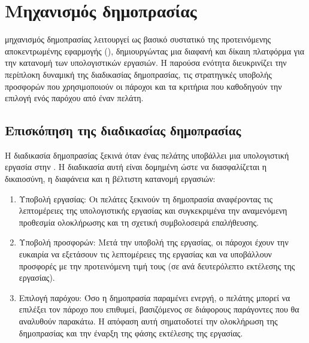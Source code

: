 \chapter{Μηχανισμός δημοπρασίας}
 μηχανισμός δημοπρασίας λειτουργεί ως βασικό συστατικό της προτεινόμενης αποκεντρωμένης εφαρμογής (), δημιουργώντας μια διαφανή και δίκαιη πλατφόρμα για την κατανομή των υπολογιστικών εργασιών. Η παρούσα ενότητα διευκρινίζει την περίπλοκη δυναμική της διαδικασίας δημοπρασίας, τις στρατηγικές υποβολής προσφορών που χρησιμοποιούν οι πάροχοι και τα κριτήρια που καθοδηγούν την επιλογή ενός παρόχου από έναν πελάτη.

\section{Επισκόπηση της διαδικασίας δημοπρασίας}
Η διαδικασία δημοπρασίας ξεκινά όταν ένας πελάτης υποβάλλει μια υπολογιστική εργασία στην . Η διαδικασία αυτή είναι δομημένη ώστε να διασφαλίζεται η δικαιοσύνη, η διαφάνεια και η βέλτιστη κατανομή εργασιών:
\begin{enumerate}
    \item Υποβολή εργασίας: Οι πελάτες ξεκινούν τη δημοπρασία αναφέροντας τις λεπτομέρειες της υπολογιστικής εργασίας και συγκεκριμένα την αναμενόμενη προθεσμία ολοκλήρωσης και τη σχετική συμβολοσειρά επαλήθευσης.
    \item Υποβολή προσφορών: Μετά την υποβολή της εργασίας, οι πάροχοι έχουν την ευκαιρία να εξετάσουν τις λεπτομέρειες της εργασίας και να υποβάλλουν προσφορές με την προτεινόμενη τιμή τους (σε  ανά δευτερόλεπτο εκτέλεσης της εργασίας).
    \item Επιλογή παρόχου: Όσο η δημοπρασία παραμένει ενεργή, ο πελάτης μπορεί να επιλέξει τον πάροχο που επιθυμεί, βασιζόμενος σε διάφορους παράγοντες που θα αναλυθούν παρακάτω. Η απόφαση αυτή σηματοδοτεί την ολοκλήρωση της δημοπρασίας και την έναρξη της φάσης εκτέλεσης της εργασίας.
\end{enumerate}

